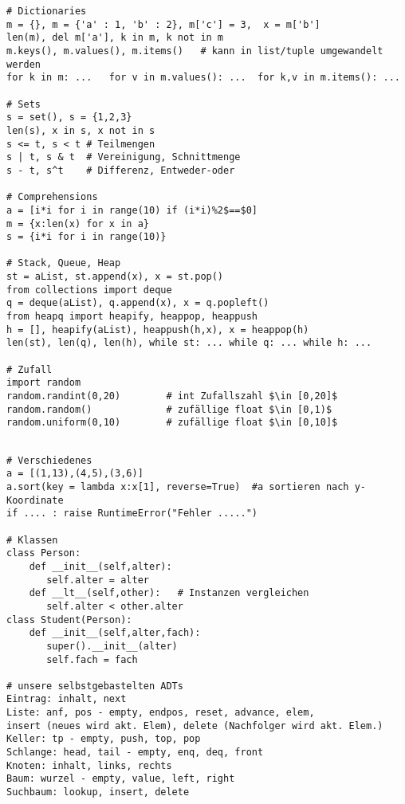 \documentclass[a4paper,11pt,landscape,twocolumn]{book}
\begin{document}
\begin{lstlisting}
# Dictionaries
m = {}, m = {'a' : 1, 'b' : 2}, m['c'] = 3,  x = m['b']
len(m), del m['a'], k in m, k not in m
m.keys(), m.values(), m.items()   # kann in list/tuple umgewandelt werden
for k in m: ...   for v in m.values(): ...  for k,v in m.items(): ...

# Sets
s = set(), s = {1,2,3}
len(s), x in s, x not in s 
s <= t, s < t # Teilmengen
s | t, s & t  # Vereinigung, Schnittmenge
s - t, s^t    # Differenz, Entweder-oder

# Comprehensions
a = [i*i for i in range(10) if (i*i)%2$==$0]
m = {x:len(x) for x in a}
s = {i*i for i in range(10)}

# Stack, Queue, Heap
st = aList, st.append(x), x = st.pop()
from collections import deque
q = deque(aList), q.append(x), x = q.popleft()
from heapq import heapify, heappop, heappush
h = [], heapify(aList), heappush(h,x), x = heappop(h)
len(st), len(q), len(h), while st: ... while q: ... while h: ...

# Zufall
import random
random.randint(0,20)        # int Zufallszahl $\in [0,20]$
random.random()             # zufällige float $\in [0,1)$
random.uniform(0,10)        # zufällige float $\in [0,10]$

\end{lstlisting}
\newpage
\begin{lstlisting}

# Verschiedenes
a = [(1,13),(4,5),(3,6)]
a.sort(key = lambda x:x[1], reverse=True)  #a sortieren nach y-Koordinate
if .... : raise RuntimeError("Fehler .....")

# Klassen
class Person:
    def __init__(self,alter):
       self.alter = alter
    def __lt__(self,other):   # Instanzen vergleichen
	   self.alter < other.alter
class Student(Person):
    def __init__(self,alter,fach):
       super().__init__(alter)
       self.fach = fach
    
# unsere selbstgebastelten ADTs
Eintrag: inhalt, next
Liste: anf, pos - empty, endpos, reset, advance, elem,
insert (neues wird akt. Elem), delete (Nachfolger wird akt. Elem.)
Keller: tp - empty, push, top, pop
Schlange: head, tail - empty, enq, deq, front
Knoten: inhalt, links, rechts
Baum: wurzel - empty, value, left, right
Suchbaum: lookup, insert, delete
\end{lstlisting}
\end{document}
